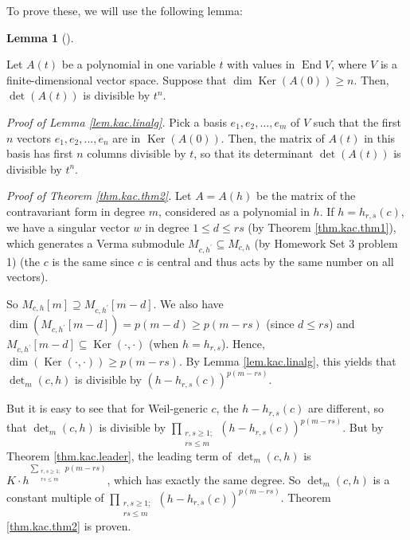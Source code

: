 \documentclass
[numbers=enddot,12pt,final,onecolumn,german,notitlepage]{scrartcl}%
\theoremstyle{definition}
\newtheorem{lem}[theo]{Lemma}
\newenvironment{lemma}[1][]
{\begin{lem}[#1]\begin{leftbar}}
{\end{leftbar}\end{lem}}
\begin{document}
To prove these, we will use the following lemma:

\begin{lemma}
\label{lem.kac.linalg}Let $A\left(  t\right)  $ be a polynomial in one
variable $t$ with values in $\operatorname*{End}V$, where $V$ is a
finite-dimensional vector space. Suppose that $\dim\operatorname*{Ker}\left(
A\left(  0\right)  \right)  \geq n$. Then, $\det\left(  A\left(  t\right)
\right)  $ is divisible by $t^{n}$.
\end{lemma}

\textit{Proof of Lemma \ref{lem.kac.linalg}.} Pick a basis $e_{1}%
,e_{2},...,e_{m}$ of $V$ such that the first $n$ vectors $e_{1},e_{2}%
,...,e_{n}$ are in $\operatorname*{Ker}\left(  A\left(  0\right)  \right)  $.
Then, the matrix of $A\left(  t\right)  $ in this basis has first $n$ columns
divisible by $t$, so that its determinant $\det\left(  A\left(  t\right)
\right)  $ is divisible by $t^{n}$.

\textit{Proof of Theorem \ref{thm.kac.thm2}.} Let $A=A\left(  h\right)  $ be
the matrix of the contravariant form in degree $m$, considered as a polynomial
in $h$. If $h=h_{r,s}\left(  c\right)  $, we have a singular vector $w$ in
degree $1\leq d\leq rs$ (by Theorem \ref{thm.kac.thm1}), which generates a
Verma submodule $M_{c,h^{\prime}}\subseteq M_{c,h}$ (by Homework Set 3 problem
1) (the $c$ is the same since $c$ is central and thus acts by the same number
on all vectors).

So $M_{c,h}\left[  m\right]  \supseteq M_{c,h^{\prime}}\left[  m-d\right]  $.
We also have $\dim\left(  M_{c,h^{\prime}}\left[  m-d\right]  \right)
=p\left(  m-d\right)  \geq p\left(  m-rs\right)  $ (since $d\leq rs$) and
$M_{c,h^{\prime}}\left[  m-d\right]  \subseteq\operatorname*{Ker}\left(
\cdot,\cdot\right)  $ (when $h=h_{r,s}$). Hence, $\dim\left(
\operatorname*{Ker}\left(  \cdot,\cdot\right)  \right)  \geq p\left(
m-rs\right)  $. By Lemma \ref{lem.kac.linalg}, this yields that $\det
\nolimits_{m}\left(  c,h\right)  $ is divisible by $\left(  h-h_{r,s}\left(
c\right)  \right)  ^{p\left(  m-rs\right)  }$.

But it is easy to see that for Weil-generic $c$, the $h-h_{r,s}\left(
c\right)  $ are different, so that $\det\nolimits_{m}\left(  c,h\right)  $ is
divisible by $\prod\limits_{\substack{r,s\geq1;\\rs\leq m}}\left(
h-h_{r,s}\left(  c\right)  \right)  ^{p\left(  m-rs\right)  }$. But by Theorem
\ref{thm.kac.leader}, the leading term of $\det\nolimits_{m}\left(
c,h\right)  $ is $K\cdot h^{\sum\limits_{\substack{r,s\geq1;\\rs\leq
m}}p\left(  m-rs\right)  }$, which has exactly the same degree. So
$\det\nolimits_{m}\left(  c,h\right)  $ is a constant multiple of
$\prod\limits_{\substack{r,s\geq1;\\rs\leq m}}\left(  h-h_{r,s}\left(
c\right)  \right)  ^{p\left(  m-rs\right)  }$. Theorem \ref{thm.kac.thm2} is proven.
\end{document}
